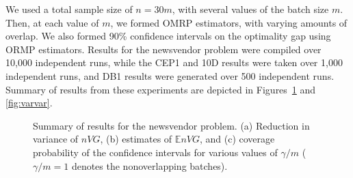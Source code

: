 \documentclass[12pt]{article}
\newcommand{\e}[1]{\mathbb{E} %
#1 %
}
\begin{document}
We used a total sample size of $n = 30 m$, with several values of the batch size $m$. 
Then, at each value of $m$, we formed OMRP estimators, with varying amounts of overlap. 
We also formed 90\% confidence intervals on the optimality gap using ORMP estimators. 
Results for the newsvendor problem were compiled over 10,000 independent runs, while the CEP1 and 10D results were taken over 1,000 independent runs, and DB1 results were generated over 500 independent runs.
Summary of results from these experiments are depicted in Figures~\ref{fig:nv} and \ref{fig:varvar}.

\begin{figure}[htb!]
	\centering
	\caption{
		Summary of results for the newsvendor problem. 
		(a) Reduction in variance of $nVG$,
		(b) estimates of $\e{nVG}$, and 
		(c) coverage probability of the confidence intervals for various values of $\gamma/m$ ($\gamma/m=1$ denotes the nonoverlapping batches).
	}
\label{fig:nv}
\end{figure}
\end{document}
